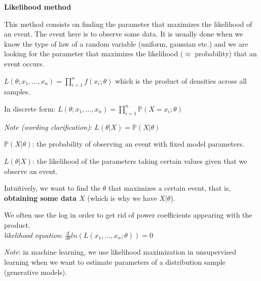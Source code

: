 {\fontsize{12pt}{22pt} \textbf{Likelihood method}\par}

\vspace{5mm}

This method consists on finding the parameter that maximizes the likelihood of an event. The event here is to observe some data. It is usually done when we know the type of law of a random variable (uniform, gaussian etc.) and we are looking for the parameter that maximizes the likelihood ($\approx$ probability) that an event occurs.

\vspace{5mm}

$L(\theta; x_1,...,x_n) = \prod_{i=1}^{n}f(x_i;\theta)$ which is the product of densities across all samples.

In discrete form: $L(\theta; x_1,...,x_n) = \prod_{i=1}^{n}\mathbb{P}(X = x_i; \theta)$


\vspace{5mm}

\textit{Note (wording clarification)}: $L(\theta | X) = \mathbb{P} (X | \theta)$

$\mathbb{P} (X | \theta)$: the probability of observing an event with fixed model parameters.

$L(\theta | X)$: the likelihood of the parameters taking certain values given that we observe an event.

\vspace{5mm}

Intuitively, we want to find the $\theta$ that maximizes a certain event, that is, \textbf{obtaining some data $X$} (which is why we have $X | \theta$).

We often use the log in order to get rid of power coefficients appearing with the product. \\
\textit{likelihood equation}: $\frac{d}{d\theta}ln(L(x_1,...,x_n;\theta))=0$

\vspace{5mm}

\textit{Note}: in machine learning, we use likelihood maximization in unsupervised learning when we want to estimate parameters of a distribution sample (generative models).

\vspace{5mm}